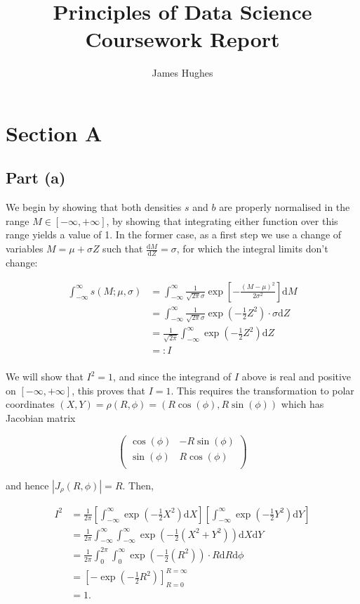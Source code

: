 \documentclass[12pt]{article}
\title{Principles of Data Science Coursework Report}
\author{James Hughes}
\begin{document}
\maketitle
\newpage


\section*{Section A}

\subsection*{Part (a)}

We begin by showing that both densities $s$ and $b$ are properly normalised in the range $M\in [-\infty, +\infty]$, by showing that integrating either function over this range yields a value of 1.
In the former case, as a first step we use a change of variables $M = \mu + \sigma Z$ such that $\frac{\mathrm{d}M}{\mathrm{d}Z} = \sigma$, for which the integral limits don't change:

\begin{align*}
    \int_{-\infty}^\infty s(M;\mu, \sigma) & = \int_{-\infty}^\infty \frac{1}{\sqrt{2\pi}\sigma}\exp \left[-\frac{(M-\mu)^2}{2\sigma^2}\right]\mathrm{d}M\\
        & = \int_{-\infty}^\infty \frac{1}{\sqrt{2\pi}\sigma}\exp(-\frac{1}{2}Z^2)\cdot \sigma \mathrm{d}Z\\
        & = \frac{1}{\sqrt{2\pi}}\int_{-\infty}^\infty\exp(-\frac{1}{2}Z^2)\mathrm{d}Z\\
        & =: I\\
\end{align*}

We will show that $I^2=1$, and since the integrand of $I$ above is real and positive on $[-\infty,+\infty]$, this proves that $I=1$.
This requires the transformation to polar coordinates $(X,Y) = \rho(R,\phi) = (R\cos(\phi), R\sin(\phi))$ which has Jacobian matrix

\[
    \begin{pmatrix}
        \cos(\phi) & -R\sin(\phi) \\
        \sin(\phi) & R\cos(\phi) \\
    \end{pmatrix}
\]

and hence $|J_\rho(R,\phi)| = R$. Then,

\begin{align*}
    I^2 & = \frac{1}{2\pi}\left[\int_{-\infty}^\infty\exp(-\frac{1}{2}X^2)\mathrm{d}X\right]\left[\int_{-\infty}^\infty\exp(-\frac{1}{2}Y^2)\mathrm{d}Y\right] \\
        & = \frac{1}{2\pi}\int_{-\infty}^\infty\int_{-\infty}^\infty\exp(-\frac{1}{2}(X^2 + Y^2))\mathrm{d}X\mathrm{d}Y\\
        & = \frac{1}{2\pi}\int_{0}^{2\pi}\int_{0}^\infty\exp(-\frac{1}{2}(R^2))\cdot R \mathrm{d}R\mathrm{d}\phi\\
        & = \left[-\exp(-\frac{1}{2}R^2)\right]_{R=0}^{R=\infty} \\
        & = 1. \\
\end{align*}
\end{document}
